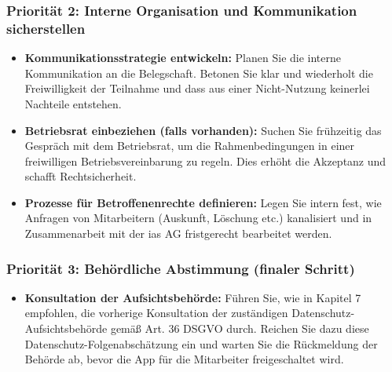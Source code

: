 \documentclass[12pt, a4paper]{article}
\begin{document}
\subsubsection*{Priorität 2: Interne Organisation und Kommunikation sicherstellen}
\begin{itemize}
    \item \textbf{Kommunikationsstrategie entwickeln:} Planen Sie die interne Kommunikation an die Belegschaft. Betonen Sie klar und wiederholt die Freiwilligkeit der Teilnahme und dass aus einer Nicht-Nutzung keinerlei Nachteile entstehen.
    \item \textbf{Betriebsrat einbeziehen (falls vorhanden):} Suchen Sie frühzeitig das Gespräch mit dem Betriebsrat, um die Rahmenbedingungen in einer freiwilligen Betriebsvereinbarung zu regeln. Dies erhöht die Akzeptanz und schafft Rechtsicherheit.
    \item \textbf{Prozesse für Betroffenenrechte definieren:} Legen Sie intern fest, wie Anfragen von Mitarbeitern (Auskunft, Löschung etc.) kanalisiert und in Zusammenarbeit mit der ias AG fristgerecht bearbeitet werden.
\end{itemize}

\subsubsection*{Priorität 3: Behördliche Abstimmung (finaler Schritt)}
\begin{itemize}
    \item \textbf{Konsultation der Aufsichtsbehörde:} Führen Sie, wie in Kapitel 7 empfohlen, die vorherige Konsultation der zuständigen Datenschutz-Aufsichtsbehörde gemäß Art. 36 DSGVO durch. Reichen Sie dazu diese Datenschutz-Folgenabschätzung ein und warten Sie die Rückmeldung der Behörde ab, bevor die App für die Mitarbeiter freigeschaltet wird.
\end{itemize}
\end{document}
